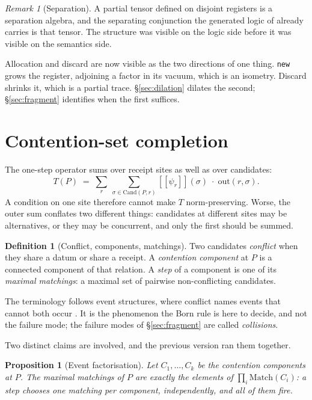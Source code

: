 \documentclass[11pt,a4paper]{article}
\theoremstyle{plain}
\newtheorem{proposition}[theorem]{Proposition}
\theoremstyle{definition}
\newtheorem{definition}[theorem]{Definition}
\theoremstyle{remark}
\newtheorem{remark}[theorem]{Remark}
\newcommand{\sem}[1]{[\![#1]\!]}
\newcommand{\Cand}{\mathrm{Cand}}
\newcommand{\Out}{\mathrm{out}}
\begin{document}
\begin{remark}[Separation]\label{rem:separation}
A partial tensor defined on disjoint registers is a separation algebra, and the
separating conjunction the generated logic of \cite{ResAlg} already carries is
that tensor. The structure was visible on the logic side before it was visible
on the semantics side.
\end{remark}

Allocation and discard are now visible as the two directions of one thing.
\texttt{new} grows the register, adjoining a factor in its vacuum, which is an
isometry. Discard shrinks it, which is a partial trace. \S\ref{sec:dilation}
dilates the second; \S\ref{sec:fragment} identifies when the first suffices.
\section{Contention-set completion}\label{sec:completion}

The one-step operator sums over receipt sites as well as over candidates:
\begin{equation}\label{eq:onestep}
  T(P) \;=\; \sum_{r}\ \sum_{\sigma \in \Cand(P,r)}
    \sem{\psi_r}(\sigma)\;\cdot\;\Out(r,\sigma).
\end{equation}
A condition on one site therefore cannot make $T$ norm-preserving. Worse, the
outer sum conflates two different things: candidates at different sites may be
alternatives, or they may be concurrent, and only the first should be summed.

\begin{definition}[Conflict, components, matchings]\label{def:conflict}
Two candidates \emph{conflict} when they share a datum or share a receipt.
A \emph{contention component} at $P$ is a connected component of that relation.
A \emph{step} of a component is one of its \emph{maximal matchings}: a maximal
set of pairwise non-conflicting candidates.
\end{definition}

The terminology follows event structures, where conflict names events that
cannot both occur \cite{Winskel}. It is the phenomenon the Born rule is here to
decide, and not the failure mode; the failure modes of \S\ref{sec:fragment} are
called \emph{collisions}.

Two distinct claims are involved, and the previous version ran them together.

\begin{proposition}[Event factorisation]\label{prop:eventfact}
Let $C_1,\dots,C_k$ be the contention components at $P$. The maximal matchings
of $P$ are exactly the elements of $\prod_i \mathrm{Match}(C_i)$: a step chooses
one matching per component, independently, and all of them fire.
\end{proposition}
\end{document}
